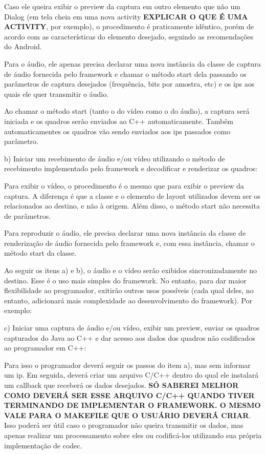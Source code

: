 \documentclass{acm_proc_article-sp}
\newcommand{\todo}[1]{\textcolor[rgb]{1.00,0.00,0.00}{\bf \uppercase{#1}}}
\begin{document}
Caso ele queira exibir o preview da captura em outro elemento que não um Dialog (em tela cheia em uma nova activity \todo{explicar o que é uma activity}, por exemplo), o procedimento é praticamente idêntico, porém de acordo com as características do elemento desejado, seguindo as recomendações do Android.

Para o áudio, ele apenas precisa declarar uma nova instância da classe de captura de áudio fornecida pelo framework e chamar o método start dela passando os parâmetros de captura desejados (frequência, bits por amostra, etc) e os ips aos quais ele quer transmitir o áudio.

Ao chamar o método start (tanto o do vídeo como o do áudio), a captura será iniciada e os quadros serão enviados ao C++ automaticamente. Também automaticamentes os quadros vão sendo enviados aos ips passados como parâmetro.

b) Iniciar um recebimento de áudio e/ou vídeo utilizando o método de recebimento implementado pelo framework e decodificar e renderizar os quadros:

Para exibir o vídeo, o procedimento é o mesmo que para exibir o preview da captura. A diferença é que a classe e o elemento de layout utilizados devem ser os relacionados ao destino, e não à origem. Além disso, o método start não necessita de parâmetros.

Para reproduzir o áudio, ele precisa declarar uma nova instância da classe de renderização de áudio fornecida pelo framework e, com essa instância, chamar o método start da classe. 

Ao seguir os itens a) e b), o áudio e o vídeo serão exibidos sincronizadamente no destino. Esse é o uso mais simples do framework. No entanto, para dar maior flexibilidade ao programador, exitirão outros usos possíveis (cada qual deles, no entanto, adicionará mais complexidade ao desenvolvimento do framework). Por exemplo:

c) Iniciar uma captura de áudio e/ou vídeo, exibir um preview, enviar os quadros capturados do Java ao C++ e dar acesso aos dados dos quadros não codificados ao programador em C++:

Para isso o programador deverá seguir os passos do item a), mas sem informar um ip. Em seguida, deverá criar um arquivo C/C++ dentro do qual ele instalará um callback que receberá os dados desejados. \todo{só saberei melhor como deverá ser esse arquivo C/C++ quando tiver terminando de implementar o framework. O mesmo vale para o makefile que o usuário deverá criar}. Isso poderá ser útil caso o programador não queira transmitir os dados, mas apenas realizar um processamento sobre eles ou codificá-los utilizando sua própria implementação de codec.
\end{document}
